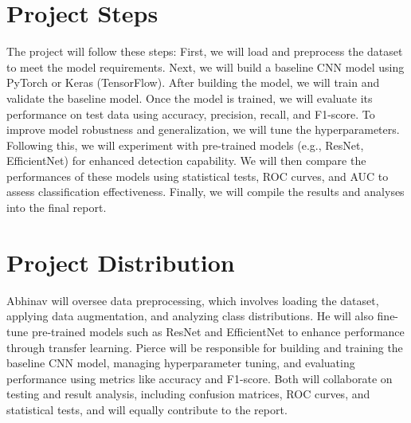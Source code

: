 \documentclass{article}
\begin{document}
\section{Project Steps}
The project will follow these steps:
First, we will load and preprocess the dataset to meet the model requirements. Next, we will build a baseline CNN model using PyTorch or Keras (TensorFlow). After building the model, we will train and validate the baseline model. Once the model is trained, we will evaluate its performance on test data using accuracy, precision, recall, and F1-score. To improve model robustness and generalization, we will tune the hyperparameters. Following this, we will experiment with pre-trained models (e.g., ResNet, EfficientNet) for enhanced detection capability. We will then compare the performances of these models using statistical tests, ROC curves, and AUC to assess classification effectiveness. Finally, we will compile the results and analyses into the final report.

\section{Project Distribution}
Abhinav will oversee data preprocessing, which involves loading the dataset, applying data augmentation, and analyzing class distributions. He will also fine-tune pre-trained models such as ResNet and EfficientNet to enhance performance through transfer learning. Pierce will be responsible for building and training the baseline CNN model, managing hyperparameter tuning, and evaluating performance using metrics like accuracy and F1-score. Both will collaborate on testing and result analysis, including confusion matrices, ROC curves, and statistical tests, and will equally contribute to the report.
\end{document}
